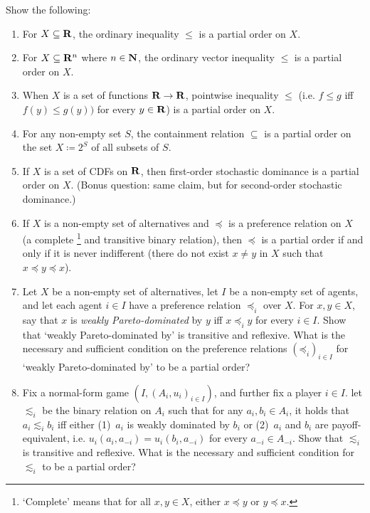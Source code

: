 \begin{exercise}
	\label{exercise:partial_orders}
	Show the following:
	\begin{enumerate}[label=(\alph*)]
	
		\item For $X \subseteq \mathbf{R}$, the ordinary inequality $\leq$ is a partial order on $X$.

		\item For $X \subseteq \mathbf{R}^n$ where $n \in \mathbf{N}$, the ordinary vector inequality $\leq$ is a partial order on $X$.

		\item When $X$ is a set of functions $\mathbf{R} \to \mathbf{R}$, pointwise inequality $\leq$ (i.e. $f \leq g$ iff $f(y) \leq g(y))$ for every $y \in \mathbf{R}$) is a partial order on $X$.

		\item For any non-empty set $S$, the containment relation $\subseteq$ is a partial order on the set $X \coloneqq 2^S$ of all subsets of $S$.

		\item \label{item:partial_orders:fosd} If $X$ is a set of CDFs on $\mathbf{R}$, then first-order stochastic dominance is a partial order on $X$. (Bonus question: same claim, but for second-order stochastic dominance.)

		\item \label{item:posets:pref} If $X$ is a non-empty set of alternatives and $\preceq$ is a preference relation on $X$ (a complete%
			\footnote{`Complete' means that for all $x,y \in X$, either $x \preceq y$ or $y \preceq x$.}
		and transitive binary relation), then $\preceq$ is a partial order if and only if it is never indifferent (there do not exist $x \neq y$ in $X$ such that $x \preceq y \preceq x$).

		\item Let $X$ be a non-empty set of alternatives, let $I$ be a non-empty set of agents, and let each agent $i \in I$ have a preference relation $\preceq_i$ over $X$. For $x,y \in X$, say that $x$ is \emph{weakly Pareto-dominated} by $y$ iff $x \preceq_i y$ for every $i \in I$. Show that `weakly Pareto-dominated by' is transitive and reflexive. What is the necessary and sufficient condition on the preference relations $(\mathord{\preceq}_i)_{i \in I}$ for `weakly Pareto-dominated by' to be a partial order?

		\item Fix a normal-form game $(I,(A_i,u_i)_{i \in I})$, and further fix a player $i \in I$. let $\lesssim_i$ be the binary relation on $A_i$ such that for any $a_i, b_i \in A_i$, it holds that $a_i \lesssim_i b_i$ iff either (1)~$a_i$ is weakly dominated by $b_i$ or (2)~$a_i$ and $b_i$ are payoff-equivalent, i.e. $u_i(a_i,a_{-i}) = u_i(b_i,a_{-i})$ for every $a_{-i} \in A_{-i}$. Show that $\lesssim_i$ is transitive and reflexive. What is the necessary and sufficient condition for $\lesssim_i$ to be a partial order?
	
	\end{enumerate}
\end{exercise}

